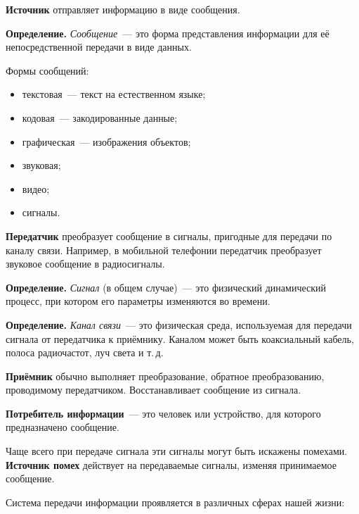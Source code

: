 \documentclass[a4paper,11pt]{article}
\begin{document}
\textbf{Источник} отправляет информацию в виде сообщения.

\begin{opr}
\textbf{Определение.} \emph{Сообщение}~--- это форма представления информации для её
непосредственной передачи в виде данных.
\end{opr}
Формы сообщений:
\begin{itemize}
  \item текстовая~--- текст на естественном языке;
  \item кодовая~--- закодированные данные;
  \item графическая~--- изображения объектов;
  \item звуковая;
  \item видео;
  \item сигналы.
\end{itemize}

\textbf{Передатчик} преобразует сообщение в сигналы, пригодные для передачи
по каналу связи. Например, в мобильной телефонии передатчик преобразует
звуковое сообщение в радиосигналы.

\begin{opr}
\textbf{Определение.} \emph{Сигнал} (в общем случае)~--- это физический динамический процесс,
при котором его параметры изменяются во времени.
\end{opr}

\begin{opr}
\textbf{Определение.} \emph{Канал связи}~--- это физическая среда, используемая для передачи
сигнала от передатчика к приёмнику. Каналом может быть коаксиальный кабель,
полоса радиочастот, луч света и т.\,д.
\end{opr}

\textbf{Приёмник} обычно выполняет преобразование, обратное преобразованию,
проводимому передатчиком. Восстанавливает сообщение из сигнала.

\textbf{Потребитель информации}~--- это человек или устройство, для которого
предназначено сообщение.

Чаще всего при передаче сигнала эти сигналы могут быть искажены помехами.
\textbf{Источник помех} действует на передаваемые сигналы, изменяя
принимаемое сообщение.

Система передачи информации проявляется в различных сферах нашей жизни:
\end{document}
